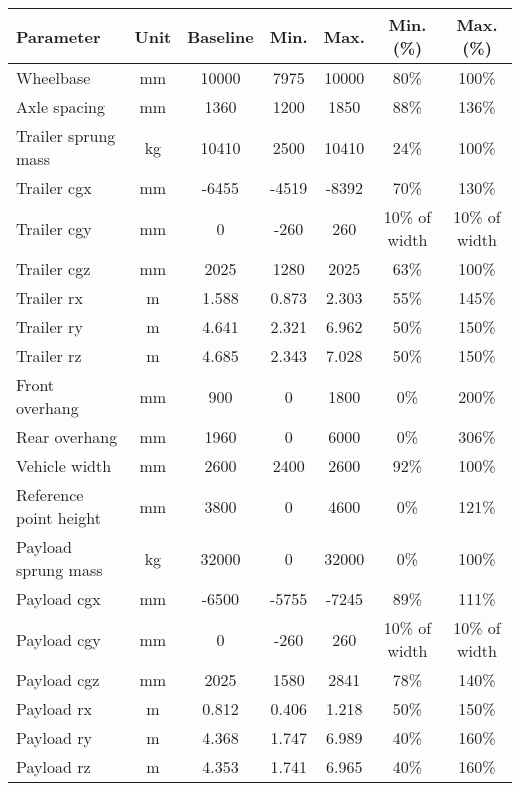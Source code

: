 \begin{table}[H]
	\centering\footnotesize
	\begin{threeparttable}

		\begin{tabulary}{\textwidth}{lcccccc}
			\toprule
			\textbf{Parameter} & \textbf{Unit} & \textbf{Baseline} & \textbf{Min.} & \textbf{Max.} & \textbf{Min. (\%)} & \textbf{Max. (\%)} \\

			\midrule
			Wheelbase & mm    & 10000 & 7975  & 10000 & 80\%  & 100\% \\
			Axle spacing & mm    & 1360  & 1200  & 1850  & 88\%  & 136\% \\
			Trailer sprung mass & kg    & 10410 & 2500  & 10410 & 24\%  & 100\% \\
			Trailer \gls{cgx} & mm    & -6455  & -4519  & -8392  & 70\%  & 130\% \\
			Trailer \gls{cgy} & mm    & 0     & -260  & 260   & 10\% of width & 10\% of width \\
			Trailer \gls{cgz} & mm    & 2025  & 1280  & 2025  & 63\%  & 100\% \\
			Trailer \gls{rx} & m     & 1.588 & 0.873 & 2.303 & 55\%  & 145\% \\
			Trailer \gls{ry} & m     & 4.641 & 2.321 & 6.962 & 50\%  & 150\% \\
			Trailer \gls{rz} & m     & 4.685 & 2.343 & 7.028 & 50\%  & 150\% \\
			Front overhang & mm & 900   & 0     & 1800  & 0\%   & 200\% \\
			Rear overhang & mm & 1960  & 0     & 6000  & 0\%   & 306\% \\
			Vehicle width & mm    & 2600  & 2400  & 2600  & 92\%  & 100\% \\
			Reference point height & mm & 3800  & 0     & 4600  & 0\%   & 121\% \\
			Payload sprung mass & kg    & 32000 & 0     & 32000 & 0\%   & 100\% \\
			Payload \gls{cgx} & mm    & -6500  & -5755  & -7245  & 89\%  & 111\% \\
			Payload \gls{cgy} & mm    & 0     & -260  & 260   & 10\% of width & 10\% of width \\
			Payload \gls{cgz} & mm    & 2025  & 1580  & 2841  & 78\%  & 140\% \\
			Payload \gls{rx} & m     & 0.812 & 0.406 & 1.218 & 50\%  & 150\% \\
			Payload \gls{ry} & m     & 4.368 & 1.747 & 6.989 & 40\%  & 160\% \\
			Payload \gls{rz} & m     & 4.353 & 1.741 & 6.965 & 40\%  & 160\% \\


\end{tabulary}
\end{threeparttable}
\end{table}
